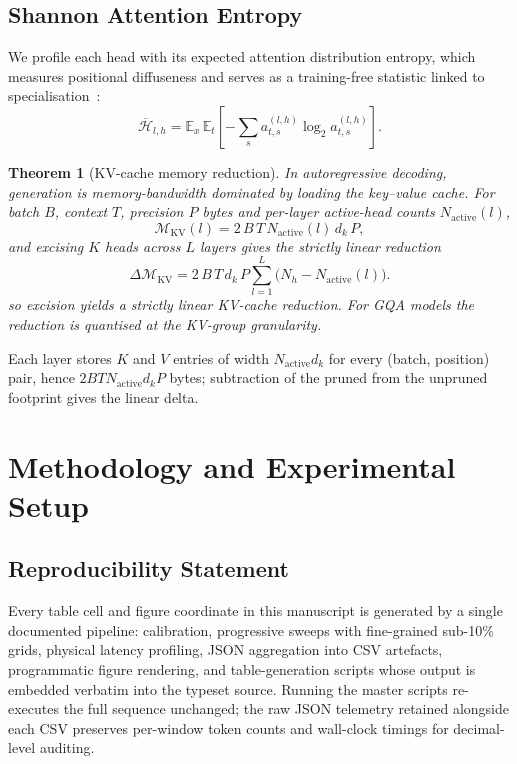 \documentclass[10pt,journal,compsoc]{IEEEtran}
\newtheorem{theorem}{Theorem}
\newcommand{\ekv}{\mathcal{M}_{\mathrm{KV}}}
\begin{document}
\subsection{Shannon Attention Entropy}
We profile each head with its expected attention distribution entropy, which
measures positional diffuseness and serves as a training-free statistic linked to
specialisation~\cite{voita2019analyzing}:
\begin{equation}
\overline{\mathcal{H}}_{l,h}=\mathbb{E}_{x}\,\mathbb{E}_{t}\left[-\sum_{s}a^{(l,h)}_{t,s}\log_{2}a^{(l,h)}_{t,s}\right].
\label{eq:entropy}
\end{equation}

\begin{theorem}[KV-cache memory reduction]
\label{thm:kv}
In autoregressive decoding, generation is memory-bandwidth dominated by loading
the key--value cache. For batch $B$, context $T$, precision $P$ bytes and
per-layer active-head counts $N_{\text{active}}(l)$,
\begin{equation}
\ekv(l)=2\,B\,T\,N_{\text{active}}(l)\,d_k\,P,
\label{eq:kv}
\end{equation}
and excising $K$ heads across $L$ layers gives the strictly linear reduction
\begin{equation}
\Delta\ekv=2\,B\,T\,d_k\,P\!\sum_{l=1}^{L}\!\big(N_h-N_{\text{active}}(l)\big).
\label{eq:kvdelta}
\end{equation}
so excision yields a strictly linear KV-cache reduction. For GQA models the
reduction is quantised at the KV-group granularity.
\end{theorem}
\begin{IEEEproof}
Each layer stores $K$ and $V$ entries of width $N_{\text{active}}d_k$ for every
(batch, position) pair, hence $2BTN_{\text{active}}d_kP$ bytes; subtraction of the
pruned from the unpruned footprint gives the linear delta.
\end{IEEEproof}

\section{Methodology and Experimental Setup}
\subsection{Reproducibility Statement}
Every table cell and figure coordinate in this manuscript is generated by a
single documented pipeline: calibration, progressive sweeps with fine-grained
sub-10\% grids, physical latency profiling, JSON aggregation into CSV artefacts,
programmatic figure rendering, and table-generation scripts whose output is
embedded verbatim into the typeset source. Running the master scripts
re-executes the full sequence unchanged; the raw JSON telemetry retained
alongside each CSV preserves per-window token counts and wall-clock timings for
decimal-level auditing.
\end{document}
